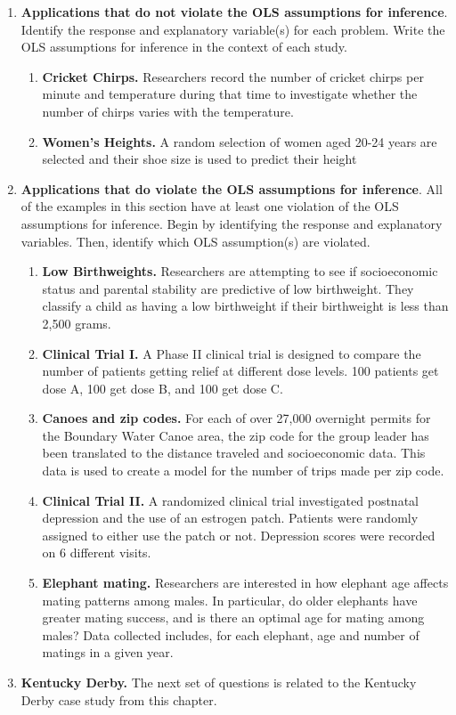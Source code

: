 \documentclass[
]{krantz}
\providecommand{\tightlist}{%
  \setlength{\itemsep}{0pt}\setlength{\parskip}{0pt}}
\begin{document}
\begin{enumerate}
\def\labelenumi{\arabic{enumi}.}
\item
  \textbf{Applications that do not violate the OLS assumptions for inference}. Identify the response and explanatory variable(s) for each problem. Write the OLS assumptions for inference in the context of each study.

  \begin{enumerate}
  \def\labelenumii{\alph{enumii}.}
  \tightlist
  \item
    \textbf{Cricket Chirps.} Researchers record the number of cricket chirps per minute and temperature during that time to investigate whether the number of chirps varies with the temperature.
  \item
    \textbf{Women's Heights.} A random selection of women aged 20-24 years are selected and their shoe size is used to predict their height\\
  \end{enumerate}
\item
  \textbf{Applications that do violate the OLS assumptions for inference}. All of the examples in this section have at least one violation of the OLS assumptions for inference. Begin by identifying the response and explanatory variables. Then, identify which OLS assumption(s) are violated.

  \begin{enumerate}
  \def\labelenumii{\alph{enumii}.}
  \tightlist
  \item
    \textbf{Low Birthweights.} Researchers are attempting to see if socioeconomic status and parental stability are predictive of low birthweight. They classify a child as having a low birthweight if their birthweight is less than 2,500 grams.
  \item
    \textbf{Clinical Trial I.} A Phase II clinical trial is designed to compare the number of patients getting relief at different dose levels. 100 patients get dose A, 100 get dose B, and 100 get dose C.
  \item
    \textbf{Canoes and zip codes.} For each of over 27,000 overnight permits for the Boundary Water Canoe area, the zip code for the group leader has been translated to the distance traveled and socioeconomic data. This data is used to create a model for the number of trips made per zip code.
  \item
    \textbf{Clinical Trial II.} A randomized clinical trial investigated postnatal depression and the use of an estrogen patch. Patients were randomly assigned to either use the patch or not. Depression scores were recorded on 6 different visits.
  \item
    \textbf{Elephant mating.} Researchers are interested in how elephant age affects mating patterns among males. In particular, do older elephants have greater mating success, and is there an optimal age for mating among males? Data collected includes, for each elephant, age and number of matings in a given year.\\
  \end{enumerate}
\item
  \textbf{Kentucky Derby.} The next set of questions is related to the Kentucky Derby case study from this chapter.


\end{enumerate}
\end{document}
